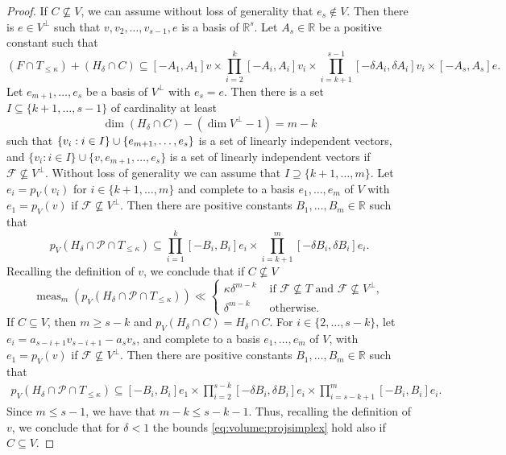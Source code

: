 \documentclass[JEP,XML,SOM,Unicode,published]{cedram}
\newcommand\RR{\mathbb{R}}
\DeclareMathOperator{\meas}{meas}
\theoremstyle{definition}
\numberwithin{theorem}{section}
\begin{document}
\begin{proof}
If $C\nsubseteq V$, we can assume without loss of generality that $e_s\notin V$. Then there is $e\in V^{\perp}$ such that $v, v_2,\dots,v_{s-1},e$ is a basis of $\RR^s$.
Let $A_s\in\RR$ be a positive constant such that
\begin{equation*}
(F\cap T_{\leq\kappa})+(H_\delta\cap C)\subseteq [- A_1, A_1] v\times \prod_{i=2}^{k}[-A_i, A_i]v_i\times \prod_{i=k+1}^{s-1}[-\delta A_i, \delta A_i]v_i\times [-A_s, A_s]e.
\end{equation*}
Let $e_{m+1},\dots, e_s$ be a basis of $V^{\perp}$ with $e_s\!=\!e$. Then there is a set \hbox{$I\subseteq\{k+1,\dots,s-1\}$} of cardinality at least
\[
\dim (H_\delta\cap C)-(\dim V^{\perp}-1)=m-k
\]
such that $\{v_i:\nobreak i\in\nobreak I\}\cup\{e_{m+1},\dots,e_s\}$ is a set of linearly independent vectors, and $\{v_i:i\in I\}\cup\{v, e_{m+1},\dots,e_s\}$ is a set of linearly independent vectors if $\mathcal F\nsubseteq V^{\perp}$.
Without loss of generality we can assume that $I\supseteq\{k+1,\dots,m\}$. Let $e_i=p_V(v_i)$ for $i\in\{k+1,\dots,m\}$ and complete to a basis $e_1,\dots,e_m$ of $V$ with $e_1=p_V(v)$ if $\mathcal F\nsubseteq V^{\perp}$.
Then there are positive constants $B_1,\dots,B_m\in \RR$ such that
\begin{equation*}\label{eq:volume:CnotinV}
p_V(H_\delta\cap\mathcal P\cap T_{\leq\kappa})\subseteq \prod_{i=1}^{k}[-B_i, B_i]e_i\times \prod_{i=k+1}^{m}[-\delta B_i, \delta B_i]e_i.
\end{equation*}
Recalling the definition of $v$, we conclude that if $C\nsubseteq V$
\begin{equation}\label{eq:volume:projsimplex}
\meas_m(p_V(H_\delta\cap\mathcal P\cap T_{\leq\kappa}))\ll\begin{cases}\kappa\delta^{m-k} & \text{ if } \mathcal F\nsubseteq T \text{ and } \mathcal F\nsubseteq V^{\perp}, \\
\delta^{m-k} & \text{ otherwise.}
\end{cases}
\end{equation}
If $C\subseteq V$, then $m\geq s-k$ and $p_V(H_\delta\cap C)=H_\delta\cap C$. For $i\in\{2,\dots,s-k\}$, let $e_i= a_{s-i+1}v_{s-i+1}-a_sv_s$, and complete to a basis $e_1,\dots,e_m$ of $V$, with $e_1=p_V(v)$ if $\mathcal F\nsubseteq V^{\perp}$. Then there are positive constants $B_1,\dots,B_m\in\RR$ such that
\begin{gather*}\label{eq:volume:CinV}
p_V(H_\delta\cap\mathcal P\cap T_{\leq\kappa})\subseteq [- B_i, B_i]e_1 \times \prod_{i=2}^{s-k}[-\delta B_i, \delta B_i]e_i\times \prod_{i=s-k+1}^{m}[- B_i, B_i]e_i.
\end{gather*}
Since $m\leq s-1$, we have that $m-k\leq s-k-1$. Thus,
recalling the definition of $v$, we conclude that for $\delta < 1$ the bounds \eqref{eq:volume:projsimplex} hold also if $C\subseteq V$.


\end{proof}
\end{document}
